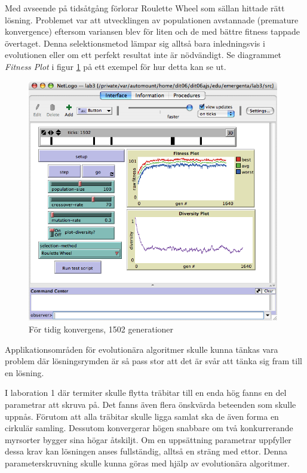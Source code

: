 \documentclass[titlepage, a4paper, 12pt]{article}
\begin{document}
Med avseende på tidsåtgång förlorar Roulette Wheel som sällan hittade
rätt lösning. Problemet var att utvecklingen av populationen
avstannade (premature konvergence) eftersom variansen blev för liten
och de med bättre fitness tappade övertaget. Denna selektionsmetod
lämpar sig alltså bara inledningsvis i evolutionen eller om ett
perfekt resultat inte är nödvändigt. Se diagrammet \textit{Fitness Plot} i
figur \ref{fig:images/premature-convergence} på ett exempel för hur
detta kan se ut.

\begin{figure}[H]
  \begin{center}
    \includegraphics[width=110mm]{images/premature-convergence.png}
    \caption{För tidig konvergens, 1502 generationer}
    \label{fig:images/premature-convergence}
  \end{center}
\end{figure}

Applikationsområden för evolutionära algoritmer skulle kunna tänkas
vara problem där lösningsrymden är så pass stor att det är svår att
tänka sig fram till en lösning.

I laboration 1 där termiter skulle flytta träbitar till en enda hög
fanns en del parametrar att skruva på. Det fanns även flera önskvärda
beteenden som skulle uppnås. Förutom att alla träbitar skulle ligga
samlat ska de även forma en cirkulär samling. Dessutom konvergerar
högen snabbare om två konkurrerande myrsorter bygger sina högar
åtskiljt. Om en uppsättning parametrar uppfyller dessa krav kan
lösningen anses fullständig, alltså en sträng med ettor. Denna
parameterskruvning skulle kunna göras med hjälp av evolutionära
algoritmer.
\end{document}

